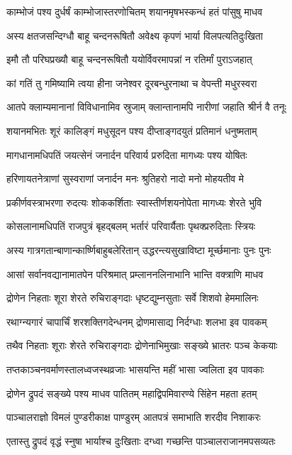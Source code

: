 \twolineshloka
{काम्भोजं पश्य दुर्धर्षं काम्भोजास्तरणोचितम्}
{शयानमृषभस्कन्धं हतं पांसुषु माधव}


\twolineshloka
{अस्य क्षतजसन्दिग्धौ बाहू चन्दनरूषितौ}
{अवेक्ष्य कृपणं भार्या विलपत्यतिदुःखिता}


\twolineshloka
{इमौ तौ परिघप्रख्यौ बाहू चन्दनरूषितौ}
{ययोर्विवरमापन्नां न रतिर्मां पुराऽजहात्}


\twolineshloka
{कां गतिं तु गमिष्यामि त्वया हीना जनेश्वर}
{दूरबन्धुरनाथा च वेपन्ती मधुरस्वरा}


\twolineshloka
{आतपे क्लाम्यमानानां विविधानामिव स्रुजाम्}
{क्लान्तानामपि नारीणां जहाति श्रीर्न वै तनूः}


\twolineshloka
{शयानमभितः शूरं कालिङ्गं मधुसूदन}
{पश्य दीप्ताङ्गदयुतं प्रतिमानं धनुष्मताम्}


\twolineshloka
{मागधानामधिपतिं जयत्सेनं जनार्दन}
{परिवार्य प्ररुदिता मागध्यः पश्य योषितः}


\twolineshloka
{हरिणायतनेत्राणां सुस्वराणां जनार्दन}
{मनः श्रुतिहरो नादो मनो मोहयतीव मे}


\twolineshloka
{प्रकीर्णवस्त्राभरणा रुदत्यः शोककर्शिताः}
{स्वास्तीर्णशयनोपेता मागध्यः शेरते भुवि}


\twolineshloka
{कोसलानामधिपतिं राजपुत्रं बृहद्बलम्}
{भर्तारं परिवार्यैताः पृथक्प्ररुदिताः स्त्रियः}


\twolineshloka
{अस्य गात्रगतान्बाणान्कार्ष्णिबाहुबलेरितान्}
{उद्धरन्त्यसुखाविष्टा मूर्च्छमानाः पुनः पुनः}


\twolineshloka
{आसां सर्वानवद्यानामातपेन परिश्रमात्}
{प्रम्लाननलिनाभानि भान्ति वक्त्राणि माधव}


\twolineshloka
{द्रोणेन निहताः शूरा शेरते रुचिराङ्गदाः}
{धृष्टद्युम्नसुताः सर्वे शिशवो हेममालिनः}


\twolineshloka
{रथाग्न्यगारं चापार्चिं शरशक्तिगदेन्धनम्}
{द्रोणमासाद्य निर्दग्धाः शलभा इव पावकम्}


\twolineshloka
{तथैव निहताः शूराः शेरते रुचिराङ्गदाः}
{द्रोणेनाभिमुखाः सङ्ख्ये भ्रातरः पञ्च केकयाः}


\twolineshloka
{तप्तकाञ्चनवर्माणस्तालध्वजस्थव्रजाः}
{भासयन्ति महीं भासा ज्वलिता इव पावकाः}


\twolineshloka
{द्रोणेन द्रुपदं सङ्ख्ये पश्य माधव पातितम्}
{महाद्विपमिवारण्ये सिंहेन महता हतम्}


\twolineshloka
{पाञ्चालराज्ञो विमलं पुण्डरीकाक्ष पाण्डुरम्}
{आतपत्रं समाभाति शरदीव निशाकरः}


\twolineshloka
{एतास्तु द्रुपदं वृद्धं स्नुषा भार्याश्च दुःखिताः}
{दग्ध्वा गच्छन्ति पाञ्चालराजानमपसव्यतः}


